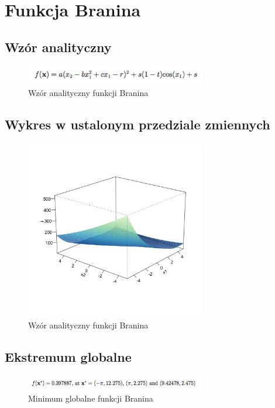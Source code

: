 \documentclass{article}
\begin{document}
          
          
                 
 \clearpage                
\newpage
\section{Funkcja Branina}
\subsection{Wzór analityczny}
\begin{figure}[!htbp]
    \centering
    \includegraphics[width=0.7\textwidth]{inc/wzory/branin}
     \caption{Wzór analityczny funkcji Branina}
    \end{figure}                 

    
\subsection{Wykres w ustalonym przedziale zmiennych  }
       \begin{figure}[!htbp]
    \centering
    \includegraphics[width=0.7\textwidth]{inc/wykresyfunkcji/branin}
     \caption{Wzór analityczny funkcji Branina}
    \end{figure}                 

\subsection{Ekstremum globalne}
\begin{figure}[!htbp]
    \centering
    \includegraphics[width=0.7\textwidth]{inc/wzory/branin-global-minimum}
     \caption{Minimum globalne funkcji Branina}
    \end{figure}             
    
\end{document}
